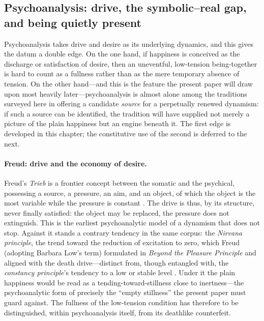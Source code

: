 \subsection{Psychoanalysis: drive, the symbolic--real gap, and being quietly present}
\label{p19:sub:theories-psych}

Psychoanalysis takes drive and desire as its underlying dynamics, and this gives the datum a double edge. On the one hand, if happiness is conceived as the discharge or satisfaction of desire, then an uneventful, low-tension being-together is hard to count as a fullness rather than as the mere temporary absence of tension. On the other hand---and this is the feature the present paper will draw upon most heavily later---psychoanalysis is almost alone among the traditions surveyed here in offering a candidate \emph{source} for a perpetually renewed dynamism: if such a source can be identified, the tradition will have supplied not merely a picture of the plain happiness but an engine beneath it. The first edge is developed in this chapter; the constitutive use of the second is deferred to the next.

\paragraph{Freud: drive and the economy of desire.} Freud's \emph{Trieb} is a frontier concept between the somatic and the psychical, possessing a source, a pressure, an aim, and an object, of which the object is the most variable while the pressure is constant \parencite{freud1915}. The drive is thus, by its structure, never finally satisfied: the object may be replaced, the pressure does not extinguish. This is the earliest psychoanalytic model of a dynamism that does not stop. Against it stands a contrary tendency in the same corpus: the \emph{Nirvana principle}, the trend toward the reduction of excitation to zero, which Freud (adopting Barbara Low's term) formulated in \emph{Beyond the Pleasure Principle} and aligned with the death drive---distinct from, though entangled with, the \emph{constancy principle}'s tendency to a low or stable level \parencite{freud1920}. Under it the plain happiness would be read as a tending-toward-stillness close to inertness---the psychoanalytic form of precisely the ``empty stillness'' the present paper must guard against. The fullness of the low-tension condition has therefore to be distinguished, within psychoanalysis itself, from its deathlike counterfeit.

